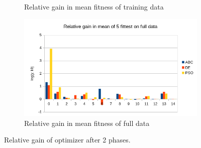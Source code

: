 \begin{figure}
\begin{subfigure}{0.6\textwidth}
        \caption{Relative gain in mean fitness of training data}
    \end{subfigure}%
    \begin{subfigure}{0.6\textwidth}
    \centering
        \includegraphics[width=0.8\linewidth]{figures/hybrid_phases2_meanfullfitness.png}
        \caption{Relative gain in mean fitness of full data}
    \end{subfigure}
    \caption{Relative gain of optimizer after 2 phases.}
    \label{fig:2phase}
    \end{figure}

